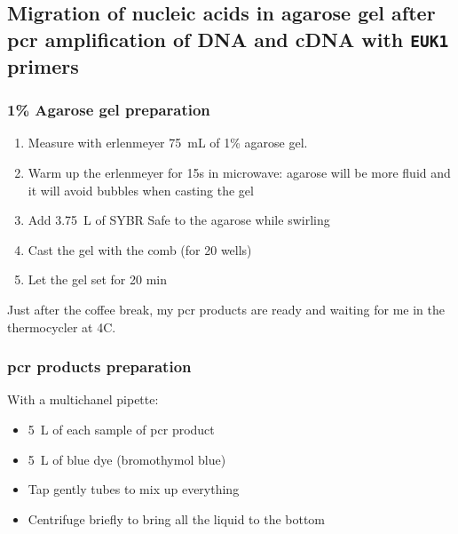 \subsection{Migration of nucleic acids in agarose gel after \gls{pcr} amplification of DNA and cDNA with \texttt{EUK1} primers}
\label{task:20180218_cj1}

\subsubsection{1\% Agarose gel preparation}

\begin{enumerate}
\item Measure with erlenmeyer 75~mL of 1\% agarose gel.
\item Warm up the erlenmeyer for 15s in microwave: agarose will be more fluid and it will avoid bubbles when casting the gel
\item Add 3.75~\textmu L of SYBR Safe to the agarose while swirling 
\item Cast the gel with the comb (for 20 wells)
\item Let the gel set for 20 min
\end{enumerate}

Just after the coffee break, my \gls{pcr} products are ready and waiting for me in the thermocycler at 4\degree C. 

\subsubsection{\gls{pcr} products preparation}

With a multichanel pipette:
\begin{itemize}
\item 5~\textmu L of each sample of \gls{pcr} product
\item 5~\textmu L of blue dye (bromothymol blue)
\item Tap gently tubes to mix up everything
\item Centrifuge briefly to bring all the liquid to the bottom
\end{itemize}

